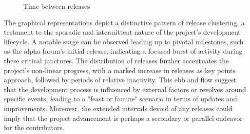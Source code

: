 \begin{figure}[h!]
	\centering
	\caption{Time between releases}
	\label{fig:releases-lines}
\end{figure}


\begin{multicols}{3}
	\noindent
	The graphical representations depict a distinctive pattern of release clustering, a testament to the sporadic and intermittent nature of the project's development lifecycle. A notable surge can be observed leading up to pivotal milestones, such as the alpha forum's initial release, indicating a focused burst of activity during these critical junctures.
	\noindent
	The distribution of releases further accentuates the project's non-linear progress, with a marked increase in releases as key points approach, followed by periods of relative inactivity. This ebb and flow suggest that the development process is influenced by external factors or revolves around specific events, leading to a "feast or famine" scenario in terms of updates and improvements.
	\noindent
	Moreover, the extended intervals devoid of any releases could imply that the project advancement is perhaps a secondary or parallel endeavor for the contributors.
\end{multicols}


